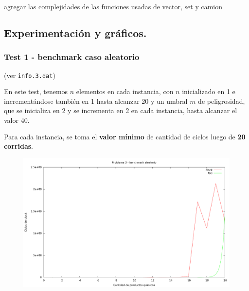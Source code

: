 agregar las complejidades de las funciones usadas de vector, set y camion

\vspace*{0.75cm} \noindent


\newpage
\subsection{Experimentación y gráficos.}

\vspace*{0.3cm}

\subsubsection{Test 1 - benchmark caso aleatorio}

(ver \verb|info.3.dat|) \medskip

En este test, tenemos $n$ elementos en cada instancia, con $n$ inicializado en 1 e incrementándose 
también en 1 hasta alcanzar 20 y un umbral $m$ de peligrosidad, que se inicializa en 2 y se incrementa 
en 2 en cada instancia, hasta alcanzar el valor 40.
 
Para cada instancia, se toma el \textbf{valor mínimo} de cantidad de ciclos luego de \textbf{20 corridas}. 

\vspace*{0.5cm}

\begin{figure}[h]
  \begin{center}
    \includegraphics[scale=0.35]{imagenes/grafico-3.png}
  \end{center}
\end{figure}

\vspace*{0.5cm}

